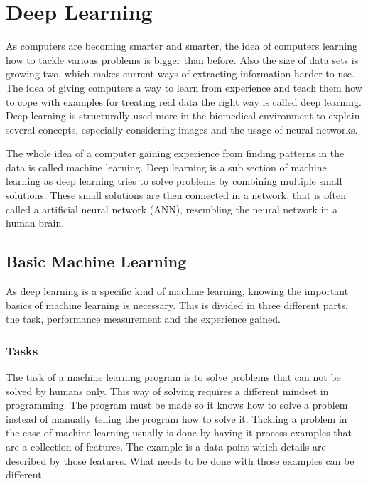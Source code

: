 \documentclass[10pt,a4paper]{report}
\begin{document}
	\clearpage
	
	\section{Deep Learning}
	
	As computers are becoming smarter and smarter, the idea of computers 
	learning how to tackle various problems is bigger than before. Also the 
	size of data sets is growing two, which makes current ways of extracting 
	information harder to use. The idea of 
	giving computers a way to learn from experience and teach them how to cope 
	with examples for treating real data the right way is called deep learning. 
	 \cite{Goodfellow-et-al-2016} Deep learning is structurally used more in the 
	biomedical environment to explain several concepts, especially considering 
	images and the usage of neural networks. \cite{greenspan2016guest}
	
	The whole idea of a computer gaining experience from finding patterns in 
	the data is called machine learning. Deep learning is a sub section of 
	machine learning as deep learning tries to solve problems by combining 
	multiple small solutions. These small solutions are then connected in a 
	network, that is often called a artificial neural network (ANN), resembling 
	the neural network in a human brain. \cite{Goodfellow-et-al-2016}
	
	\clearpage
	
	\subsection{Basic Machine Learning}
	\label{subsec:MachineLearning}
	
	As deep learning is a specific kind of machine learning, knowing the 
	important basics of machine learning is necessary. This is divided in three 
	different parts, the task, performance measurement and the experience 
	gained. \cite{Goodfellow-et-al-2016}
	
	\subsubsection{Tasks}
	
	The task of a machine learning program is to solve problems that can not be 
	solved by humans only. This way of solving requires a different mindset in 
	programming. The program must be made so it knows how to solve a problem 
	instead of manually telling the program how to solve it. Tackling a problem 
	in the case of machine learning usually is done by having it process 
	examples that are a collection of features. The example is a data point 
	which details are described by those features. What needs to be done with 
	those examples can be different. \cite{Goodfellow-et-al-2016}
	
\end{document}
